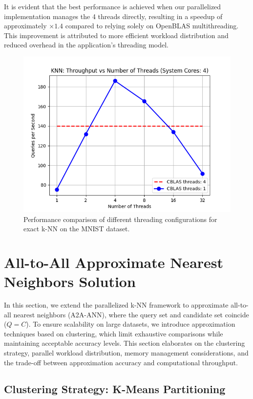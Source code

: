 \documentclass[conference]{IEEEtran}
\begin{document}
It is evident that the best performance is achieved when our parallelized implementation manages the 4 threads 
directly, resulting in a speedup of approximately $\times1.4$ compared to relying solely on OpenBLAS multithreading. 
This improvement is attributed to more efficient workload distribution and reduced overhead in the application's 
threading model.

\begin{figure}
\centering
\includegraphics[width=1\linewidth]{figures/knn_throughput_vs_threads.png}
\caption{Performance comparison of different threading configurations for exact k-NN on the MNIST dataset.}
\label{fig:knn_throughput_vs_threads}
\end{figure}

\section{All-to-All Approximate Nearest Neighbors Solution}

In this section, we extend the parallelized k-NN framework to approximate all-to-all nearest neighbors (A2A-ANN), where the query set and candidate set coincide ($Q = C$). To ensure scalability on large datasets, we introduce approximation techniques based on clustering, which limit exhaustive comparisons while maintaining acceptable accuracy levels. This section elaborates on the clustering strategy, parallel workload distribution, memory management considerations, and the trade-off between approximation accuracy and computational throughput.

\subsection{Clustering Strategy: K-Means Partitioning}
\end{document}
